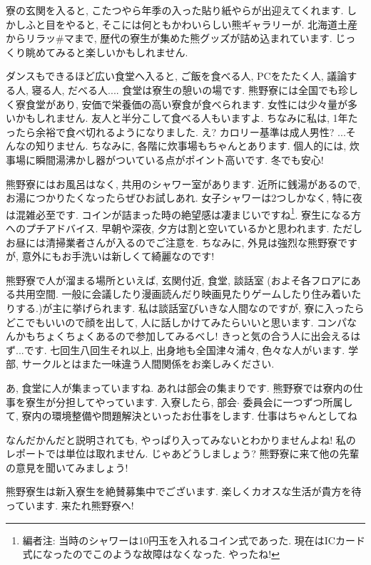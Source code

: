 \documentclass[10pt,b5jsbook,dvips,dvipdfmx,openany]{jsbook}
\theoremstyle{definition}
\begin{document}
		寮の玄関を入ると, こたつやら年季の入った貼り紙やらが出迎えてくれます. しかしふと目をやると, そこには何ともかわいらしい熊ギャラリーが. 北海道土産からリラッ\#マまで, 歴代の寮生が集めた熊グッズが詰め込まれています. じっくり眺めてみると楽しいかもしれません.

		ダンスもできるほど広い食堂へ入ると, ご飯を食べる人, PCをたたく人, 議論する人, 寝る人, だべる人.... 食堂は寮生の憩いの場です. 熊野寮には全国でも珍しく寮食堂があり, 安価で栄養価の高い寮食が食べられます. 女性には少々量が多いかもしれません. 友人と半分こして食べる人もいますよ. ちなみに私は, 1年たったら余裕で食べ切れるようになりました. え? カロリー基準は成人男性? ...そんなの知りません. ちなみに, 各階に炊事場もちゃんとあります. 個人的には, 炊事場に瞬間湯沸かし器がついている点がポイント高いです. 冬でも安心!

		熊野寮にはお風呂はなく, 共用のシャワー室があります. 近所に銭湯があるので, お湯につかりたくなったらぜひお試しあれ. 女子シャワーは2つしかなく, 特に夜は混雑必至です. コインが詰まった時の絶望感は凄まじいですね\footnote{編者注: 当時のシャワーは10円玉を入れるコイン式であった. 現在はICカード式になったのでこのような故障はなくなった. やったね!}. 寮生になる方へのプチアドバイス. 早朝や深夜, 夕方は割と空いているかと思われます. ただしお昼には清掃業者さんが入るのでご注意を. ちなみに, 外見は強烈な熊野寮ですが, 意外にもお手洗いは新しくて綺麗なのです!

		熊野寮で人が溜まる場所といえば, 玄関付近, 食堂, 談話室 (およそ各フロアにある共用空間. 一般に会議したり漫画読んだり映画見たりゲームしたり住み着いたりする.)が主に挙げられます. 私は談話室びいきな人間なのですが, 寮に入ったらどこでもいいので顔を出して, 人に話しかけてみたらいいと思います. コンパなんかもちょくちょくあるので参加してみるべし!  きっと気の合う人に出会えるはず...です. 七回生八回生それ以上, 出身地も全国津々浦々, 色々な人がいます. 学部, サークルとはまた一味違う人間関係をお楽しみください.

		あ, 食堂に人が集まっていますね. あれは部会の集まりです. 熊野寮では寮内の仕事を寮生が分担してやっています. 入寮したら, 部会$ \cdot $ 委員会に一つずつ所属して, 寮内の環境整備や問題解決といったお仕事をします. 仕事はちゃんとしてね

		なんだかんだと説明されても, やっぱり入ってみないとわかりませんよね!  私のレポートでは単位は取れません. じゃあどうしましょう?  熊野寮に来て他の先輩の意見を聞いてみましょう!

		熊野寮生は新入寮生を絶賛募集中でございます. 楽しくカオスな生活が貴方を待っています. 来たれ熊野寮へ!

\end{document}
